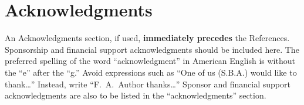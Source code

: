 \documentclass[conf]{new-aiaa}
\begin{document}
\section*{Acknowledgments}
An Acknowledgments section, if used, \textbf{immediately precedes} the References. Sponsorship and financial support acknowledgments should be included here. The preferred spelling of the word ``acknowledgment'' in American English is without the ``e'' after the ``g.'' Avoid expressions such as ``One of us (S.B.A.) would like to thank\ldots'' Instead, write ``F.~A.~Author thanks\ldots'' Sponsor and financial support acknowledgments are also to be listed in the ``acknowledgments'' section.


\end{document}
